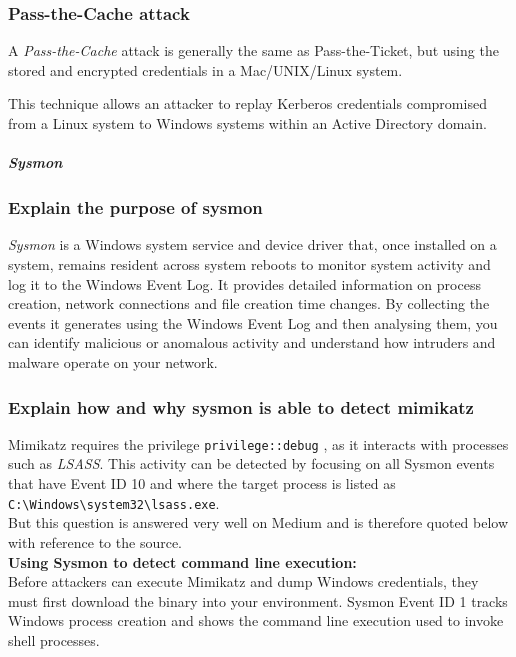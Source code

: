 \subsubsection{Pass-the-Cache attack}
A \textit{Pass-the-Cache} attack is generally the same as Pass-the-Ticket, but using the stored and encrypted credentials in a Mac/UNIX/Linux system.

This technique allows an attacker to replay Kerberos credentials compromised from a Linux system to Windows systems within an Active Directory domain.

\subparagraph{Sysmon}

\subsubsection{Explain the purpose of sysmon}
\textit{Sysmon} is a Windows system service and device driver that, once installed on a system, remains resident across system reboots to monitor system activity and log it to the Windows Event Log. It provides detailed information on process creation, network connections and file creation time changes. By collecting the events it generates using the Windows Event Log and then analysing them, you can identify malicious or anomalous activity and understand how intruders and malware operate on your network.

\subsubsection{Explain how and why sysmon is able to detect mimikatz}
Mimikatz requires the privilege \lstinline|privilege::debug| , as it interacts with processes such as \textit{LSASS}. This activity can be detected by focusing on all Sysmon events that have Event ID 10 and where the target process is listed as \lstinline|C:\Windows\system32\lsass.exe|.\\

But this question is answered very well on Medium and is therefore quoted below with reference to the source.\\

\textbf{Using Sysmon to detect command line execution:}\\
Before attackers can execute Mimikatz and dump Windows credentials, they must first download the binary into your environment. Sysmon Event ID 1 tracks Windows process creation and shows the command line execution used to invoke shell processes.\\

